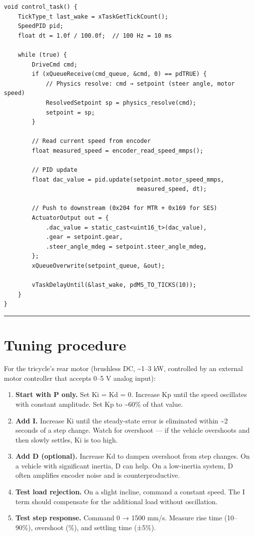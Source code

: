 \documentclass[12pt,a4paper,oneside]{report}
\begin{document}
\begin{verbatim}
void control_task() {
    TickType_t last_wake = xTaskGetTickCount();
    SpeedPID pid;
    float dt = 1.0f / 100.0f;  // 100 Hz = 10 ms

    while (true) {
        DriveCmd cmd;
        if (xQueueReceive(cmd_queue, &cmd, 0) == pdTRUE) {
            // Physics resolve: cmd → setpoint (steer angle, motor speed)
            ResolvedSetpoint sp = physics_resolve(cmd);
            setpoint = sp;
        }

        // Read current speed from encoder
        float measured_speed = encoder_read_speed_mmps();

        // PID update
        float dac_value = pid.update(setpoint.motor_speed_mmps,
                                      measured_speed, dt);

        // Push to downstream (0x204 for MTR + 0x169 for SES)
        ActuatorOutput out = {
            .dac_value = static_cast<uint16_t>(dac_value),
            .gear = setpoint.gear,
            .steer_angle_mdeg = setpoint.steer_angle_mdeg,
        };
        xQueueOverwrite(setpoint_queue, &out);

        vTaskDelayUntil(&last_wake, pdMS_TO_TICKS(10));
    }
}
\end{verbatim}

\begin{center}\rule{0.5\linewidth}{0.5pt}\end{center}

\section{Tuning procedure}\label{tuning-procedure}

For the tricycle's rear motor (brushless DC, \textasciitilde1--3 kW, controlled
by an external motor controller that accepts 0--5 V analog input):

\begin{enumerate}
\def\labelenumi{\arabic{enumi}.}
\item
  \textbf{Start with P only.} Set Ki = Kd = 0. Increase Kp until the speed
  oscillates with constant amplitude. Set Kp to \textasciitilde60\% of that
  value.
\item
  \textbf{Add I.} Increase Ki until the steady-state error is eliminated within
  \textasciitilde2 seconds of a step change. Watch for overshoot --- if the
  vehicle overshoots and then slowly settles, Ki is too high.
\item
  \textbf{Add D (optional).} Increase Kd to dampen overshoot from step changes.
  On a vehicle with significant inertia, D can help. On a low-inertia system, D
  often amplifies encoder noise and is counterproductive.
\item
  \textbf{Test load rejection.} On a slight incline, command a constant speed.
  The I term should compensate for the additional load without oscillation.
\item
  \textbf{Test step response.} Command 0 → 1500 mm/s. Measure rise time
  (10--90\%), overshoot (\%), and settling time (±5\%).
\end{enumerate}
\end{document}
